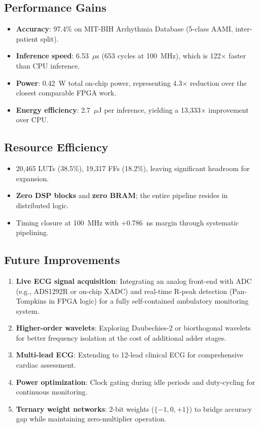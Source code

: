 \documentclass[conference]{IEEEtran}
\begin{document}
\subsection{Performance Gains}

\begin{itemize}
    \item \textbf{Accuracy}: 97.4\% on MIT-BIH Arrhythmia Database (5-class AAMI, inter-patient split).
    \item \textbf{Inference speed}: 6.53~$\mu$s (653 cycles at 100~MHz), which is 122$\times$ faster than CPU inference.
    \item \textbf{Power}: 0.42~W total on-chip power, representing 4.3$\times$ reduction over the closest comparable FPGA work.
    \item \textbf{Energy efficiency}: 2.7~$\mu$J per inference, yielding a 13,333$\times$ improvement over CPU.
\end{itemize}

\subsection{Resource Efficiency}

\begin{itemize}
    \item 20,465 LUTs (38.5\%), 19,317 FFs (18.2\%), leaving significant headroom for expansion.
    \item \textbf{Zero DSP blocks} and \textbf{zero BRAM}; the entire pipeline resides in distributed logic.
    \item Timing closure at 100~MHz with +0.786~ns margin through systematic pipelining.
\end{itemize}

\subsection{Future Improvements}

\begin{enumerate}
    \item \textbf{Live ECG signal acquisition}: Integrating an analog front-end with ADC (e.g., ADS1292R or on-chip XADC) and real-time R-peak detection (Pan-Tompkins in FPGA logic) for a fully self-contained ambulatory monitoring system.
    \item \textbf{Higher-order wavelets}: Exploring Daubechies-2 or biorthogonal wavelets for better frequency isolation at the cost of additional adder stages.
    \item \textbf{Multi-lead ECG}: Extending to 12-lead clinical ECG for comprehensive cardiac assessment.
    \item \textbf{Power optimization}: Clock gating during idle periods and duty-cycling for continuous monitoring.
    \item \textbf{Ternary weight networks}: 2-bit weights ($\{-1, 0, +1\}$) to bridge accuracy gap while maintaining zero-multiplier operation.
\end{enumerate}



\end{document}
